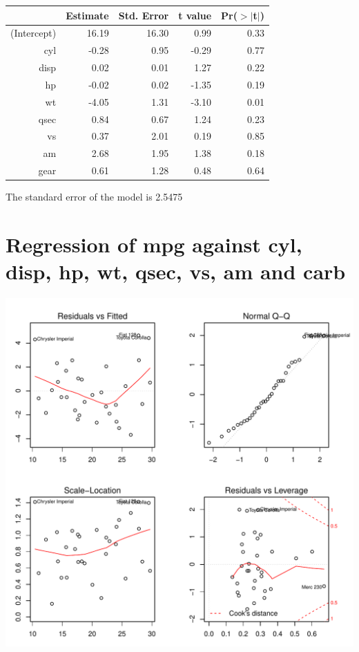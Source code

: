 \documentclass{article}\usepackage[]{graphicx}\usepackage[]{color}
\makeatletter
\def\maxwidth{ %
  \ifdim\Gin@nat@width>\linewidth
    \linewidth
  \else
    \Gin@nat@width
  \fi
}
\newenvironment{knitrout}{}{} %
\makeatother
\begin{document}
\begin{table}[ht]
\centering
\begin{tabular}{rrrrr}
  \hline
 & Estimate & Std. Error & t value & Pr($>$$|$t$|$) \\ 
  \hline
(Intercept) & 16.19 & 16.30 & 0.99 & 0.33 \\ 
  cyl & -0.28 & 0.95 & -0.29 & 0.77 \\ 
  disp & 0.02 & 0.01 & 1.27 & 0.22 \\ 
  hp & -0.02 & 0.02 & -1.35 & 0.19 \\ 
  wt & -4.05 & 1.31 & -3.10 & 0.01 \\ 
  qsec & 0.84 & 0.67 & 1.24 & 0.23 \\ 
  vs & 0.37 & 2.01 & 0.19 & 0.85 \\ 
  am & 2.68 & 1.95 & 1.38 & 0.18 \\ 
  gear & 0.61 & 1.28 & 0.48 & 0.64 \\ 
   \hline
\end{tabular}
\end{table}




The standard error of the model is 2.5475

\newpage

\section{Regression of mpg against cyl, disp, hp, wt, qsec, vs, am and carb }
\begin{knitrout}
\color{fgcolor}

{\centering \includegraphics[width=\maxwidth]{figure/lm-cyl-disp-hp-wt-qsec-vs-am-carb} 

}



\end{knitrout}
\end{document}
